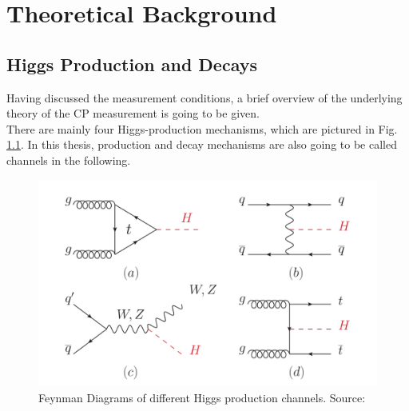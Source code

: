 
\chapter{Theoretical Background} %

\label{Chapter3} %

\section{Higgs Production and Decays}
Having discussed the measurement conditions, a brief overview of the underlying theory of the CP measurement is going to be given.\\
There are mainly four Higgs-production mechanisms, which are pictured in Fig. \ref{fig:Higgs_productions}. In this thesis, production and decay mechanisms are also going to be called channels in the following.

\begin{figure}[h]
	\centering
	\includegraphics[width=0.7\linewidth]{Figures/Higgs-production_PDG_Huge_p183}
	\caption{Feynman Diagrams of different Higgs production channels. Source: \parencite{PDG_source}}
	\label{fig:Higgs_productions}
\end{figure}\\
